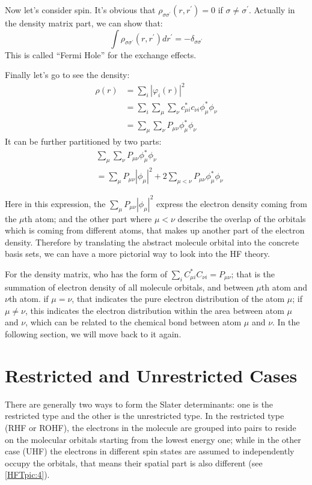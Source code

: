 Now let's consider spin. It's obvious that $\rho_{\sigma\sigma^{'}}(r, r^{'}) =
0$ if $\sigma \neq \sigma^{'}$. Actually in the density matrix part, we can
show that:
\begin{equation}
 \int \rho_{\sigma\sigma^{'}}(r, r^{'}) dr^{'} = -\delta_{\sigma\sigma^{'}}
\end{equation}
This is called ``Fermi Hole'' for the exchange effects.

Finally let's go to see the density:
\begin{align}\label{HF_PMTE_eq:3}
 \rho(r) &= \sum_{i}|\varphi_{i}(r)|^{2} \nonumber \\
&= \sum_{i}\sum_{\mu}\sum_{\nu}c^{*}_{\mu i}c_{\nu i}\phi^{*}_{\mu}\phi_{\nu}
\nonumber \\
&= \sum_{\mu}\sum_{\nu}P_{\mu\nu}\phi^{*}_{\mu}\phi_{\nu}
\end{align}
It can be further partitioned by two parts:
\begin{align}\label{HF_PMTE_eq:4}
&\sum_{\mu}\sum_{\nu}P_{\mu\nu}\phi^{*}_{\mu}\phi_{\nu} \nonumber \\
&= \sum_{\mu}P_{\mu\nu}|\phi_{\mu}|^{2} + 
2\sum_{\mu<\nu}P_{\mu\nu}\phi^{*}_{\mu}\phi_{\nu}
\end{align}

Here in this expression, the $\sum_{\mu}P_{\mu\nu}|\phi_{\mu}|^{2}$ express the
electron density coming from the $\mu$th atom; and the other part where $\mu
< \nu$ describe the overlap of the orbitals which is coming from
different atoms, that makes up another part of the electron density.
Therefore by translating the abstract molecule orbital into the
concrete basis sets, we can have a more pictorial way to look into
the HF theory.

For the density matrix, who has the form of $\sum_{i}C^{*}_{\mu i}
C_{\nu i} = P_{\mu\nu}$; that is the summation of electron
density of all molecule orbitals, and between $\mu$th atom and
$\nu$th atom. if $\mu=\nu$, that indicates the pure electron distribution
of the atom $\mu$; if $\mu \neq \nu$, this indicates the electron
distribution within the area between atom $\mu$ and $\nu$, which can
be related to the chemical bond between atom $\mu$ and $\nu$.  In the following
section, we will move back to it again.


\section{Restricted and Unrestricted Cases}\label{RUC_in_HF}
%
%
There are generally two ways to form the Slater determinants: one is
the restricted type and the other is the unrestricted type. In the restricted
type (RHF or ROHF), the electrons in the molecule are grouped into pairs to
reside on the molecular orbitals starting from the lowest energy one; while in
the other case (UHF) the electrons in different spin states are assumed to
independently occupy the orbitals, that means their spatial part is also
different (see \ref{HFTpic:4}). 

